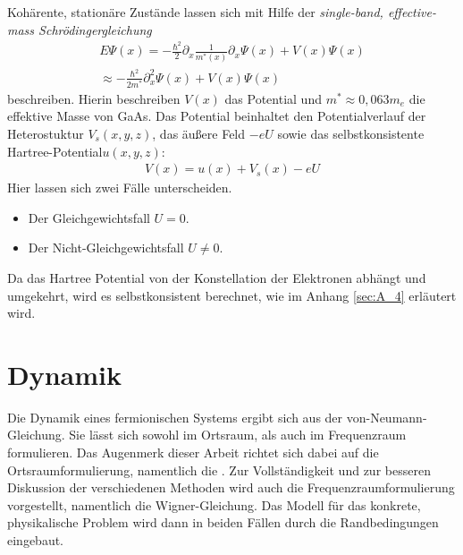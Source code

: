 Kohärente, stationäre Zustände lassen sich mit Hilfe der \emph{single-band, effective-mass Schrödingergleichung} \cite{frensley3}
\begin{equation}
  \begin{aligned}
    E\Psi(x) = -\frac{\hbar^2}{2}\partial_x \frac{1}{m^*(x)}\partial_x\Psi(x) + V(x)\Psi(x)    \\
    \approx -\frac{\hbar^2}{2m^*}\partial_x^2\Psi(x) + V(x)\Psi(x)
  \end{aligned}
  \label{eq:schroedinger}
\end{equation}
beschreiben. Hierin beschreiben $V(x)$ das Potential und $m^*\approx 0,063m_e$ die effektive Masse von GaAs. Das Potential beinhaltet den Potentialverlauf der Heterostuktur $V_s(x,y,z)$, das äußere Feld $-eU$ sowie das selbstkonsistente Hartree-Potential$u(x,y,z)$:
\begin{align}
  V({x}) = u({x}) + V_s({x}) - eU
\end{align}
Hier lassen sich zwei Fälle unterscheiden.
\begin{itemize}
  \item Der Gleichgewichtsfall $U=0$. %
  \item Der Nicht-Gleichgewichtsfall $U\neq 0$. %
\end{itemize}
Da das Hartree Potential von der Konstellation der Elektronen abhängt und umgekehrt, wird es selbstkonsistent berechnet, wie im Anhang \ref{sec:A_4} erläutert wird.





\section{Dynamik}
Die Dynamik eines fermionischen Systems ergibt sich aus der von-Neumann-Gleichung. Sie lässt sich sowohl im Ortsraum, als auch im Frequenzraum formulieren. Das Augenmerk dieser Arbeit richtet sich dabei auf die Ortsraumformulierung, namentlich die \lvn. Zur Vollständigkeit und zur besseren Diskussion der verschiedenen Methoden wird auch die Frequenzraumformulierung vorgestellt, namentlich die Wigner-Gleichung. Das Modell für das konkrete, physikalische Problem wird dann in beiden Fällen durch die Randbedingungen eingebaut.


